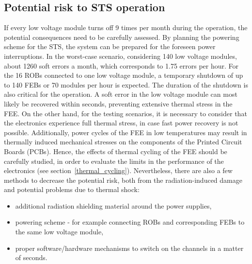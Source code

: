\subsection{Potential risk to STS operation}
If every low voltage module turns off 9 times per month during the operation, the potential consequences need to be carefully assessed. By planning the powering scheme for the \gls{STS}, the system can be prepared for the foreseen power interruptions. In the worst-case scenario, considering 140 low voltage modules,  about 1260 soft errors a month, which corresponds to 1.75 errors per hour.  For the 16 \glspl{ROB} connected to one low voltage module, a temporary shutdown of up to 140 \glspl{FEB} or 70 modules per hour is expected.  The duration of the shutdown is also critical for the operation. A soft error in the low voltage module can most likely be recovered within seconds, preventing extensive thermal stress in the \gls{FEE}. On the other hand, for the testing scenarios, it is necessary to consider that the electronics experience full thermal stress, in case fast power recovery is not possible. Additionally, power cycles of the \gls{FEE} in low temperatures may result in thermally induced mechanical stresses on the components of the Printed Circuit Boards (\glspl{PCB}). Hence, the effects of thermal cycling of the \gls{FEE} should be carefully studied, in order to evaluate the limits in the performance of the electronics  (see section~\ref{thermal_cycling}). Nevertheless, there are also a few methods to decrease the potential risk, both from the radiation-induced damage and potential problems due to thermal shock:
\begin{itemize}
    \item additional radiation shielding material around the power supplies,
    \item powering scheme - for example connecting \glspl{ROB} and corresponding \glspl{FEB} to the same low voltage module,
    \item proper software/hardware mechanisms to switch on the channels in a matter of seconds.
\end{itemize}
\newpage
